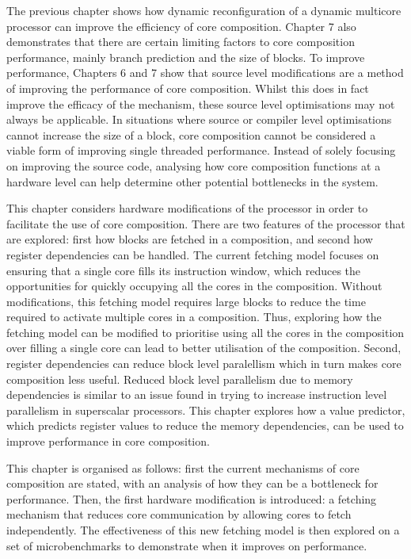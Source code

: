 The previous chapter shows how dynamic reconfiguration of a dynamic multicore processor can improve the efficiency of core composition.
Chapter 7 also demonstrates that there are certain limiting factors to core composition performance, mainly branch prediction and the size of blocks.
To improve performance, Chapters 6 and 7 show that source level modifications are a method of improving the performance of core composition.
Whilst this does in fact improve the efficacy of the mechanism, these source level optimisations may not always be applicable.
In situations where source or compiler level optimisations cannot increase the size of a block, core composition cannot be considered a viable form of improving single threaded performance.
Instead of solely focusing on improving the source code, analysing how core composition functions at a hardware level can help determine other potential bottlenecks in the system.

This chapter considers hardware modifications of the processor in order to facilitate the use of core composition.
There are two features of the processor that are explored: first how blocks are fetched in a composition, and second how register dependencies can be handled.
The current fetching model focuses on ensuring that a single core fills its instruction window, which reduces the opportunities for quickly occupying all the cores in the composition.
Without modifications, this fetching model requires large blocks to reduce the time required to activate multiple cores in a composition.
Thus, exploring how the fetching model can be modified to prioritise using all the cores in the composition over filling a single core can lead to better utilisation of the composition.
Second, register dependencies can reduce block level paralellism which in turn makes core composition less useful.
Reduced block level parallelism due to memory dependencies is similar to an issue found in trying to increase instruction level parallelism in superscalar processors.
This chapter explores how a value predictor, which predicts register values to reduce the memory dependencies, can be used to improve performance in core composition.

This chapter is organised as follows: first the current mechanisms of core composition are stated, with an analysis of how they can be a bottleneck for performance.
Then, the first hardware modification is introduced: a fetching mechanism that reduces core communication by allowing cores to fetch independently.
The effectiveness of this new fetching model is then explored on a set of microbenchmarks to demonstrate when it improves on performance.